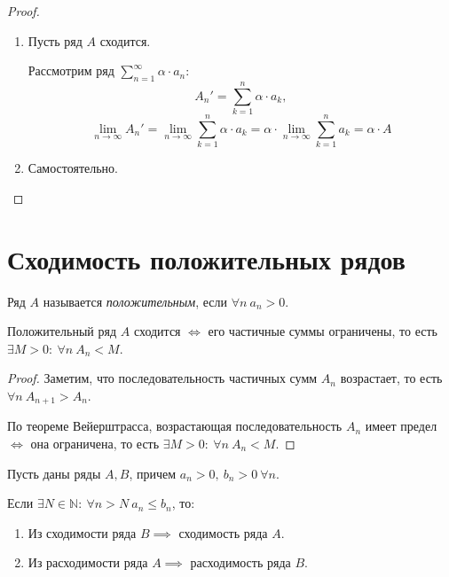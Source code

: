 \begin{proof}
    \begin{enumerate}
        \item Пусть ряд $ A $ сходится.

              Рассмотрим ряд $ \sum_{n=1}^{\infty}\alpha \cdot a_n $:
              \[
                  A_n' = \sum_{k=1}^{n}\alpha \cdot a_k,
              \]
              \[
                  \underset{n \rightarrow\infty}{\lim}A_n' = \underset{n \rightarrow\infty}{\lim}\sum_{k=1}^{n} \alpha \cdot a_k = \alpha \cdot \underset{n \rightarrow\infty}{\lim}\sum_{k=1}^{n}a_k = \alpha \cdot A
              \]

        \item Самостоятельно.
    \end{enumerate}
\end{proof}

\section{Сходимость положительных рядов}

\begin{definition}
    Ряд $ A $ называется \emph{положительным}, если $ \forall n \ a_n>0 $.
\end{definition}

\begin{theorem}\label{theorem:2.1}
    Положительный ряд $ A $ сходится $ \iff $ его частичные суммы ограничены, то есть $ \exists M > 0: \ \forall n \ A_n < M $.
\end{theorem}

\begin{proof}
    Заметим, что последовательность частичных сумм $ A_n $ возрастает, то есть $ \forall n \ A_{n+1} > A_n $.

    По теореме Вейерштрасса, возрастающая последовательность $ A_n $ имеет предел $ \iff $ она ограничена, то есть $ \exists M>0: \ \forall n \ A_n < M $.
\end{proof}

\begin{theorem}\label{theorem:6.2}
    Пусть даны ряды $ A,B $, причем $a_n > 0, \ b_n > 0 \ \forall n$.

    Если $\exists N \in \mathbb{N}: \ \forall n > N \ a_n \leqslant b_n$, то:
    \begin{enumerate}
        \item Из сходимости ряда $B \implies$ сходимость ряда $A$.
        \item Из расходимости ряда $A \implies$ расходимость ряда $B$.
    \end{enumerate}
\end{theorem}

